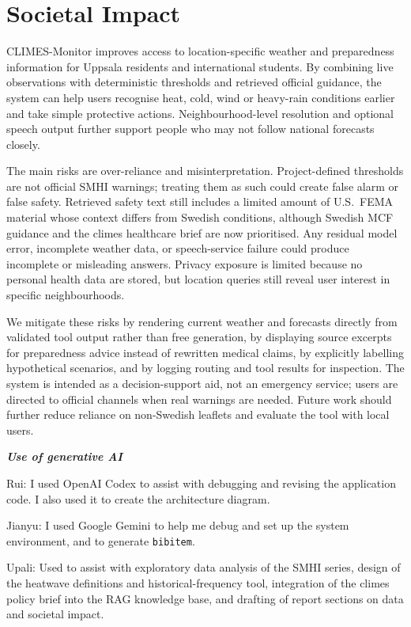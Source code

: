 \documentclass[a4paper,10pt]{article}
\begin{document}
\section{Societal Impact}

CLIMES-Monitor improves access to location-specific weather and preparedness information for Uppsala residents and international students. 
By combining live observations with deterministic thresholds and retrieved official guidance, the system can help users recognise heat, cold, wind or heavy-rain conditions earlier and take simple protective actions. 
Neighbourhood-level resolution and optional speech output further support people who may not follow national forecasts closely.

The main risks are over-reliance and misinterpretation. 
Project-defined thresholds are not official SMHI warnings; treating them as such could create false alarm or false safety. 
Retrieved safety text still includes a limited amount of U.S.\ FEMA material whose context differs from Swedish conditions, although Swedish MCF guidance and the climes healthcare brief are now prioritised. 
Any residual model error, incomplete weather data, or speech-service failure could produce incomplete or misleading answers. 
Privacy exposure is limited because no personal health data are stored, but location queries still reveal user interest in specific neighbourhoods.

We mitigate these risks by rendering current weather and forecasts directly from validated tool output rather than free generation, by displaying source excerpts for preparedness advice instead of rewritten medical claims, by explicitly labelling hypothetical scenarios, and by logging routing and tool results for inspection. 
The system is intended as a decision-support aid, not an emergency service; users are directed to official channels when real warnings are needed. 
Future work should further reduce reliance on non-Swedish leaflets and evaluate the tool with local users.

\hfill \break
\textit{\textbf{Use of generative AI}}

Rui: I used OpenAI Codex to assist with debugging and revising the application code. I also used it to create the architecture diagram.

Jianyu: I used Google Gemini to help me debug and set up the system environment, and to generate \texttt{bibitem}.

Upali: Used to assist with exploratory data analysis of the SMHI series, design of the heatwave definitions and historical-frequency tool, integration of the climes policy brief into the RAG knowledge base, and drafting of report sections on data and societal impact.
\end{document}
